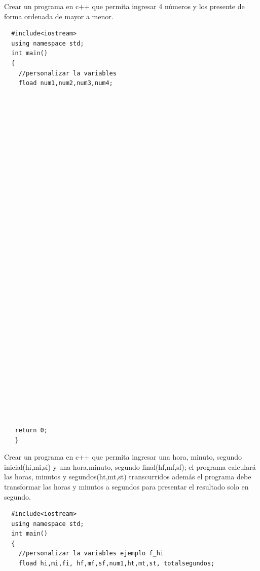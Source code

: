 \documentclass[12pt]{exam}
\begin{document}
\begin{questions}
  \begin{center}
  
  \end{center}




\newpage
  

\question[25] Crear un programa en c++ que permita ingresar 4 números  y los presente de forma ordenada de mayor a menor. 

  
\begin{lstlisting}
  #include<iostream>
  using namespace std;
  int main()
  {
    //personalizar la variables 
    fload num1,num2,num3,num4;

















    














    

   return 0;
   }
\end{lstlisting}


\newpage
\question[25] Crear un programa en c++  que permita ingresar una hora, minuto, segundo inicial(hi,mi,si) y una hora,minuto, segundo final(hf,mf,sf); el programa calculará las horas, minutos y segundos(ht,mt,st) transcurridos además el programa debe transformar las horas y minutos a segundos para presentar el resultado solo en segundo. 
\vspace{2cm}
\begin{lstlisting}
  #include<iostream>
  using namespace std;
  int main()
  {
    //personalizar la variables ejemplo f_hi
    fload hi,mi,fi, hf,mf,sf,num1,ht,mt,st, totalsegundos;


\end{lstlisting}
\end{questions}
\end{document}
